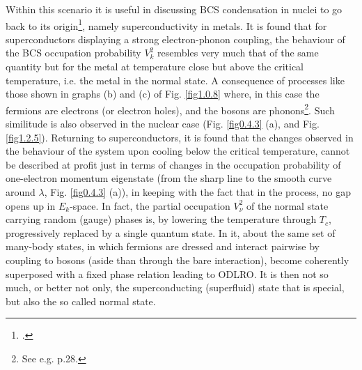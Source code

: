 Within this scenario it is useful in discussing BCS condensation in nuclei to go back to its origin\footnote{\cite{Bohr:58}.}, namely superconductivity in metals. It is found that for superconductors displaying a strong electron-phonon coupling, the behaviour of the BCS occupation probability $V^2_k$ resembles very much that of the same quantity but for the metal at temperature close but above the critical temperature, i.e. the metal in the normal state. A consequence of processes like those shown in graphs (b) and (c) of Fig. \ref{fig1.0.8} where, in this case the fermions are electrons (or electron holes), and the bosons are phonons\footnote{See e.g. \cite{Tinkham:96} p.28.}. Such similitude is also observed in the nuclear case (Fig. \ref{fig0.4.3} (a), and Fig. \ref{fig1.2.5}). Returning to superconductors, it is found that the changes observed in the behaviour of the system upon cooling below the critical temperature, cannot be described at profit just in terms of changes in the occupation probability of one-electron momentum eigenstate (from the sharp line to the smooth curve around $\lambda$, Fig. \ref{fig0.4.3} (a)), in keeping with the fact that in the process, no gap opens up in $E_k$-space. In fact, the partial occupation $V^2_\nu$ of the normal state carrying random (gauge) phases is, by lowering the temperature through $T_c$, progressively replaced by a single quantum state. In it, about the same set of many-body states, in which fermions are dressed and interact pairwise by coupling to bosons (aside than through the bare interaction), become coherently superposed with a fixed phase relation leading to ODLRO. It is then not so much, or better not only, the superconducting (superfluid) state that is special, but also the so called normal state.
 
